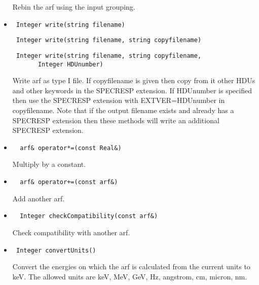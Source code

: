 \documentclass[11pt]{book}
\begin{document}
\begin{itemize}
           Rebin the arf using the input grouping.

\item  \begin{verbatim} Integer write(string filename) \end{verbatim}
       \begin{verbatim} Integer write(string filename, string copyfilename) \end{verbatim}
       \begin{verbatim} Integer write(string filename, string copyfilename,
       Integer HDUnumber) \end{verbatim}

          Write arf as type I file. If copyfilename is given then
          copy from it other HDUs and other keywords in the SPECRESP
          extension. If HDUnumber is specified then use the SPECRESP
          extension with EXTVER=HDUnumber in copyfilename. Note that 
          if the output filename exists and already has a SPECRESP 
          extension then these methods will write an
          additional SPECRESP extension.

\item  \begin{verbatim}  arf& operator*=(const Real&) \end{verbatim}

          Multiply by a constant.

\item  \begin{verbatim}  arf& operator+=(const arf&) \end{verbatim}

          Add another arf.

\item  \begin{verbatim}  Integer checkCompatibility(const arf&) \end{verbatim}

          Check compatibility with another arf.

\item  \begin{verbatim} Integer convertUnits() \end{verbatim}

          Convert the energies on which the arf is calculated from the
          current units to keV. The allowed units are keV, MeV, GeV, Hz,
          angstrom, cm, micron, nm.

\end{itemize}
\end{document}
